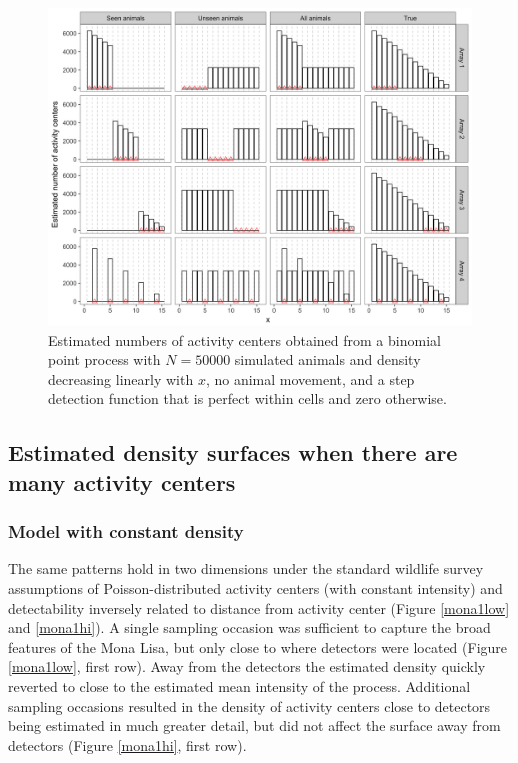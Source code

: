 \documentclass[a4paper,12pt]{article}
\begin{document}
\begin{figure}[htbp]
\centering
\includegraphics[width=1\textwidth]{binompp_inf}
\caption{Estimated numbers of activity centers obtained from a binomial point process with $N=50000$ simulated animals and density decreasing linearly with $x$, no animal movement, and a step detection function that is perfect within cells and zero otherwise.}
\label{binom}
\end{figure}

\subsection{Estimated density surfaces when there are many activity centers}

\subsubsection{Model with constant density}
The same patterns hold in two dimensions under the standard wildlife survey assumptions of Poisson-distributed activity centers (with constant intensity) and detectability inversely related to distance from activity center (Figure \ref{mona1low} and \ref{mona1hi}). A single sampling occasion was sufficient to capture the broad features of the Mona Lisa, but only close to where detectors were located (Figure \ref{mona1low}, first row). Away from the detectors the estimated density quickly reverted to close to the estimated mean intensity of the process. Additional sampling occasions resulted in the density of activity centers close to detectors being estimated in much greater detail, but did not affect the surface away from detectors (Figure \ref{mona1hi}, first row). 
\end{document}
